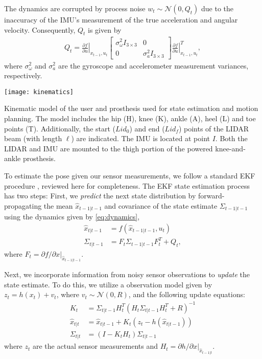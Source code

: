 The dynamics are corrupted by process noise $w_t \sim \mathcal{N}(0, Q_t)$ due
to the inaccuracy of the IMU's measurement of the true acceleration and angular
velocity. Consequently, $Q_t$ is given by
\begin{align}
    Q_t = \left. \frac{\partial f}{\partial u} \right|_{x_{t-1}, u_t}
        \begin{bmatrix} \sigma_\omega^2 I_{3\times3} & 0 \\ 
            0 & \sigma_a^2 I_{3\times3} \end{bmatrix}
        \left. \frac{\partial f}{\partial u} \right|_{x_{t-1}, u_t}^T,
\end{align}
where $\sigma_\omega^2$ and $\sigma_a^2$ are the gyroscope and accelerometer
measurement variances, respectively.

\begin{marginfigure}
    \centering
    \texttt{[image: kinematics]}
    \caption[Kinematic model of the user and prosthesis used for state
    estimation and motion planning]{Kinematic model of the user and prosthesis
    used for state estimation and motion planning. The model includes the hip
    (H), knee (K), ankle (A), heel (L) and toe points (T). Additionally, the
    start ($Lid_0$) and end ($Lid_f$) points of the LIDAR beam (with length
    $\ell$) are indicated. The IMU is located at point $I$. Both the LIDAR and
    IMU are mounted to the thigh portion of the powered knee-and-ankle
    prosthesis.}\label{fig:kinematics}
\end{marginfigure}

To estimate the pose given our sensor measurements, we follow a standard EKF
procedure \citep{anderson1979optimal}, reviewed here for completeness. The EKF
state estimation process has two steps: First, we \emph{predict} the next state
distribution by forward-propagating the mean $\hat{x}_{t-1|t-1}$ and covariance
of the state estimate $\Sigma_{t-1|t-1}$ using the dynamics given by
\cref{eq:dynamics},
\begin{align}
    \hat{x}_{t|t-1} &= f(\hat{x}_{t-1|t-1}, u_t) \\
    \Sigma_{t|t-1} &= F_t \Sigma_{t-1|t-1} F_t^T + Q_t,
\end{align}
where $F_t = \left. \partial f / \partial x \right|_{\hat{x}_{t-1|t-1}}$.

Next, we incorporate information from noisy sensor observations to \emph{update}
the state estimate. To do this, we utilize a observation model given by $z_t =
h(x_t) + v_t$, where $v_t \sim \mathcal{N}\left(0, R \right)$, and the following
update equations:
\begin{align}
    K_t &= \Sigma_{t|t-1} H_t^T 
        {\left(H_t \Sigma_{t|t-1} H_t^T + R\right)}^{-1} \\
    \hat{x}_{t|t} &= \hat{x}_{t|t-1} + K_t \left(z_t - h(\hat{x}_{t|t-1}) \right) \\
    \Sigma_{t|t} &= \left(I - K_t H_t \right) \Sigma_{t|t-1}
\end{align}
where $z_t$ are the actual sensor measurements and $H_t = \left. \partial h /
\partial x \right|_{\hat{x}_{t-1|t}}$.

